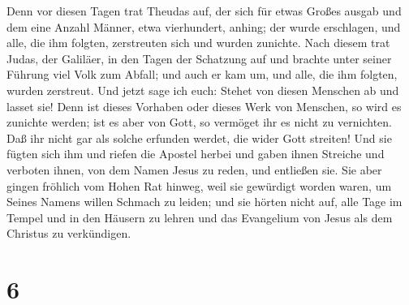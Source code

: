  Denn vor diesen Tagen trat Theudas auf, der sich für
etwas Großes ausgab und dem eine Anzahl Männer, etwa vierhundert,
anhing; der wurde erschlagen, und alle, die ihm folgten, zerstreuten
sich und wurden zunichte.  Nach diesem trat Judas, der
Galiläer, in den Tagen der Schatzung auf und brachte unter seiner
Führung viel Volk zum Abfall; und auch er kam um, und alle, die ihm
folgten, wurden zerstreut.  Und jetzt sage ich euch:
Stehet von diesen Menschen ab und lasset sie! Denn ist dieses Vorhaben
oder dieses Werk von Menschen, so wird es zunichte werden;
 ist es aber von Gott, so vermöget ihr es nicht zu
vernichten. Daß ihr nicht gar als solche erfunden werdet, die wider Gott
streiten!  Und sie fügten sich ihm und riefen die Apostel
herbei und gaben ihnen Streiche und verboten ihnen, von dem Namen Jesus
zu reden, und entließen sie.  Sie aber gingen fröhlich
vom Hohen Rat hinweg, weil sie gewürdigt worden waren, um Seines Namens
willen Schmach zu leiden;  und sie hörten nicht auf, alle
Tage im Tempel und in den Häusern zu lehren und das Evangelium von Jesus
als dem Christus zu verkündigen.

\hypertarget{section-5}{%
\section{6}\label{section-5}}

